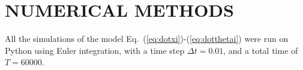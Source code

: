 \documentclass[%
 aip,
 amsmath,amssymb,
 reprint,%
]{revtex4-1}
\begin{document}
\section{\label{sec:numerics} NUMERICAL METHODS}

All the simulations of the model Eq.~(\ref{eq:dotxi})-(\ref{eq:dotthetai}) were run on Python using Euler integration, with a time step $\Delta t=0.01$, and a total time of $T=60000$. 

\end{document}
